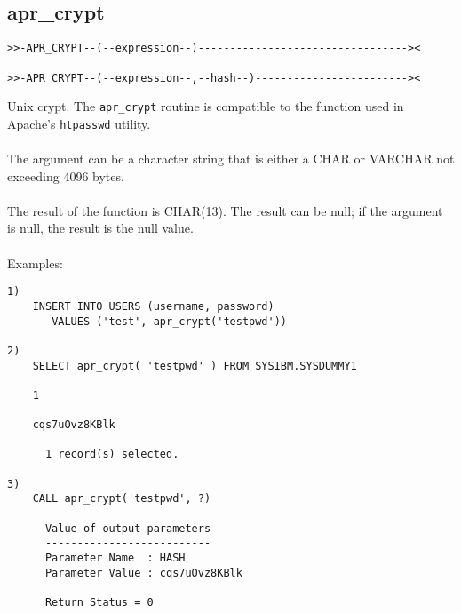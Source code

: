 \subsection{apr\_crypt} \label{aprcrypt}
\begin{verbatim}
>>-APR_CRYPT--(--expression--)---------------------------------><

>>-APR_CRYPT--(--expression--,--hash--)------------------------><
\end{verbatim}
Unix crypt. The {\tt apr\_crypt} routine is compatible to the function used in Apache's {\tt htpasswd} utility.\\
\\
The argument can be a character string that is either a \mbox{CHAR} or \mbox{VARCHAR} not exceeding 4096 bytes.\\
\\
The result of the function is CHAR(13). The result can be null; if the argument is null, the result is the null value.\\
\\
Examples:
\begin{verbatim}
1)
    INSERT INTO USERS (username, password)
       VALUES ('test', apr_crypt('testpwd'))

2)
    SELECT apr_crypt( 'testpwd' ) FROM SYSIBM.SYSDUMMY1

    1
    -------------
    cqs7uOvz8KBlk

      1 record(s) selected.

3)
    CALL apr_crypt('testpwd', ?)

      Value of output parameters
      --------------------------
      Parameter Name  : HASH
      Parameter Value : cqs7uOvz8KBlk

      Return Status = 0
\end{verbatim}
\newpage
\hypertarget{haprsha1}{}
